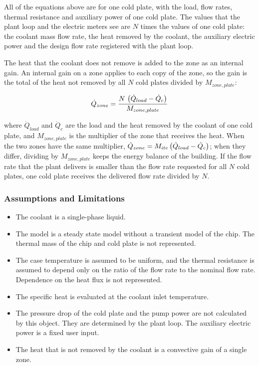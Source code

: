 All of the equations above are for one cold plate, with the load, flow rates, thermal resistance and auxiliary power of one cold plate. The values that the plant loop and the electric meters see are \(N\) times the values of one cold plate: the coolant mass flow rate, the heat removed by the coolant, the auxiliary electric power and the design flow rate registered with the plant loop.

The heat that the coolant does not remove is added to the zone as an internal gain. An internal gain on a zone applies to each copy of the zone, so the gain is the total of the heat not removed by all \(N\) cold plates divided by \(M_{zone,plate}\):

\begin{equation}
\dot{Q}_{zone} = \frac{N \, \left(\dot{Q}_{load} - \dot{Q}_{c}\right)}{M_{zone,plate}}
\end{equation}

where \(\dot{Q}_{load}\) and \(\dot{Q}_{c}\) are the load and the heat removed by the coolant of one cold plate, and \(M_{zone,plate}\) is the multiplier of the zone that receives the heat. When the two zones have the same multiplier, \(\dot{Q}_{zone} = M_{ite} \left(\dot{Q}_{load} - \dot{Q}_{c}\right)\); when they differ, dividing by \(M_{zone,plate}\) keeps the energy balance of the building. If the flow rate that the plant delivers is smaller than the flow rate requested for all \(N\) cold plates, one cold plate receives the delivered flow rate divided by \(N\).

\subsubsection{Assumptions and Limitations}\label{assumptions-and-limitations-coilcoolingitecoldplate}

\begin{itemize}
\item The coolant is a single-phase liquid.
\item The model is a steady state model without a transient model of the chip. The thermal mass of the chip and cold plate is not represented.
\item The case temperature is assumed to be uniform, and the thermal resistance is assumed to depend only on the ratio of the flow rate to the nominal flow rate. Dependence on the heat flux is not represented.
\item The specific heat is evaluated at the coolant inlet temperature.
\item The pressure drop of the cold plate and the pump power are not calculated by this object. They are determined by the plant loop. The auxiliary electric power is a fixed user input.
\item The heat that is not removed by the coolant is a convective gain of a single zone.
\end{itemize}

